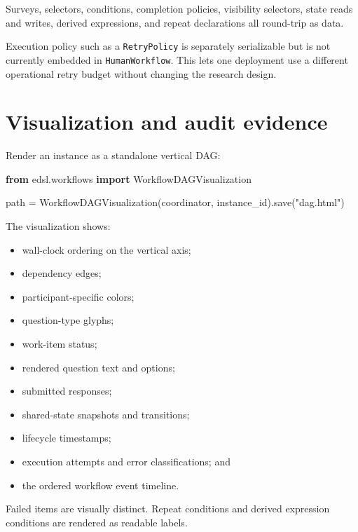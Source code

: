 \documentclass[
  10pt,
]{report}
\newenvironment{Shaded}{}{}
\newcommand{\ImportTok}[1]{\textcolor[rgb]{0.00,0.50,0.00}{\textbf{#1}}}
\newcommand{\NormalTok}[1]{#1}
\newcommand{\OperatorTok}[1]{\textcolor[rgb]{0.40,0.40,0.40}{#1}}
\newcommand{\StringTok}[1]{\textcolor[rgb]{0.25,0.44,0.63}{#1}}
\providecommand{\tightlist}{%
  \setlength{\itemsep}{0pt}\setlength{\parskip}{0pt}}
\begin{document}
Surveys, selectors, conditions, completion policies, visibility
selectors, state reads and writes, derived expressions, and repeat
declarations all round-trip as data.

Execution policy such as a \texttt{RetryPolicy} is separately
serializable but is not currently embedded in \texttt{HumanWorkflow}.
This lets one deployment use a different operational retry budget
without changing the research design.

\chapter{Visualization and audit
evidence}\label{visualization-and-audit-evidence}

Render an instance as a standalone vertical DAG:

\begin{Shaded}
\begin{Highlighting}[]
\ImportTok{from}\NormalTok{ edsl.workflows }\ImportTok{import}\NormalTok{ WorkflowDAGVisualization}

\NormalTok{path }\OperatorTok{=}\NormalTok{ WorkflowDAGVisualization(coordinator, instance\_id).save(}\StringTok{"dag.html"}\NormalTok{)}
\end{Highlighting}
\end{Shaded}

The visualization shows:

\begin{itemize}
\tightlist
\item
  wall-clock ordering on the vertical axis;
\item
  dependency edges;
\item
  participant-specific colors;
\item
  question-type glyphs;
\item
  work-item status;
\item
  rendered question text and options;
\item
  submitted responses;
\item
  shared-state snapshots and transitions;
\item
  lifecycle timestamps;
\item
  execution attempts and error classifications; and
\item
  the ordered workflow event timeline.
\end{itemize}

Failed items are visually distinct. Repeat conditions and derived
expression conditions are rendered as readable labels.
\end{document}
